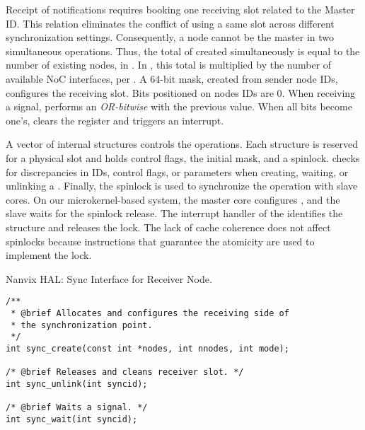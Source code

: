 				Receipt of notifications requires booking one \cnoc receiving slot
				related to the Master ID. This relation eliminates the conflict of
				using a same slot across different synchronization settings.
				Consequently, a node cannot be the master in two simultaneous operations.
				Thus, the total of \sync created simultaneously is equal to the number
				of existing nodes,  in \mppa. In \ioclusters, this total is
				multiplied by the number of available NoC interfaces,  per \dma.
				A 64-bit mask, created from sender node IDs, configures the receiving
				slot. Bits positioned on nodes IDs are 0. When receiving a signal,
				\dma performs an \textit{OR-bitwise} with the previous value. When
				all bits become one's, \dma clears the register and triggers an interrupt.

				A vector of internal structures controls the operations. Each structure
				is reserved for a physical slot and holds control flags, the initial mask,
				and a spinlock. \hal checks for discrepancies in IDs, control flags, or
				parameters when creating, waiting, or unlinking a \sync. Finally,
				the spinlock is used to synchronize the operation with slave cores.
				On our microkernel-based system, the master core configures \sync, and
				the slave waits for the spinlock release. The interrupt handler of the
				\sync identifies the structure and releases the lock. The lack of cache
				coherence does not affect spinlocks because instructions that guarantee
				the atomicity are used to implement the lock.


\begin{listing}[!tb]
\caption{Nanvix HAL: Sync Interface for Receiver Node.}
\label{code:hal-sync-receiver}
\begin{verbatim}
/**
 * @brief Allocates and configures the receiving side of
 * the synchronization point.
 */
int sync_create(const int *nodes, int nnodes, int mode);

/* @brief Releases and cleans receiver slot. */
int sync_unlink(int syncid);

/* @brief Waits a signal. */
int sync_wait(int syncid);
\end{verbatim}
\end{listing}

